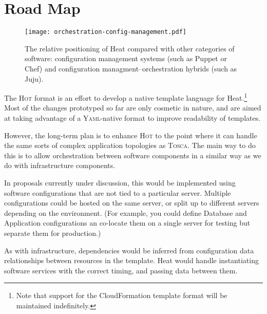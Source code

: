 \section{Road Map}

\begin{figure}[t]
\centering
\texttt{[image: orchestration-config-management.pdf]}
\caption{The relative positioning of Heat compared with other categories of software: configuration management systems (such as Puppet or Chef) and configuration managment--orchestration hybrids (such as Juju).}
\label{fig:orchestration-config-management}
\end{figure}

The \textsc{Hot} format is an effort to develop a native template language for Heat.\footnote{Note that support for the CloudFormation template format will be maintained indefinitely.} Most of the changes prototyped so far are only cosmetic in nature, and are aimed at taking advantage of a \textsc{Yaml}-native format to improve readability of templates.

However, the long-term plan is to enhance \textsc{Hot} to the point where it can handle the same sorts of complex application topologies as \textsc{Tosca}. The main way to do this is to allow orchestration between software components in a similar way as we do with infrastructure components.

In proposals currently under discussion, this would be implemented using software configurations that are not tied to a particular server. Multiple configurations could be hosted on the same server, or split up to different servers depending on the environment. (For example, you could define Database and Application configurations an co-locate them on a single server for testing but separate them for production.)

As with infrastructure, dependencies would be inferred from configuration data relationships between resources in the template. Heat would handle instantiating software services with the correct timing, and passing data between them.
